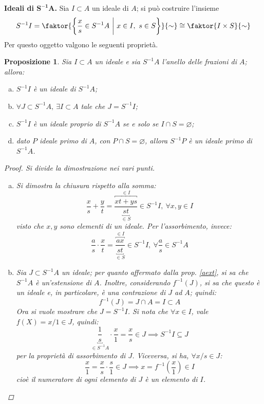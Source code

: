 \documentclass[12pt]{scrartcl}
\theoremstyle{style}
\newtheorem{prop}{Proposizione}[section]
\numberwithin{equation}{subsection}
\begin{document}
\textbf{Ideali di $\mathbf{S^{-1}A} $.} 
Sia $I \subset A$ un ideale di $A$; si pu\`o costruire l'insieme 
\begin{equation}
	S^{-1}I = \faktor{\left\{ \frac{x}{s} \in S^{-1}A \ \bigg\lvert\ x \in I, \ s \in S \right\} }{\sim} \cong \faktor{I \times S}{\sim}
\end{equation}
Per questo oggetto valgono le seguenti propriet\`a.
\begin{prop}
	Sia $I \subset A$ un ideale e sia $S^{-1}A$ l'anello delle frazioni di $A$; allora:
	\begin{enumerate}[(a).]
		\item $S^{-1}I$ \`e un ideale di $S^{-1}A$;
		\item $\forall J \subset S^{-1}A, \ \exists I\subset A$ tale che $J = S^{-1}I$;
		\item $S^{-1}I$ \`e un ideale proprio di $S^{-1}A$ se e solo se $I \cap S = \varnothing$;
		\item dato $P$ ideale primo di $A$, con $P\cap S = \varnothing$, allora $S^{-1}P$ \`e un ideale primo di $S^{-1}A$.
	\end{enumerate}
	\begin{proof}
		Si divide la dimostrazione nei vari punti.
		\begin{enumerate}[(a).]
			\item Si dimostra la chiusura rispetto alla somma:
				\[
					\frac{x}{s} + \frac{y}{t} = \frac{\overbracket{xt + ys}^{\in I} }{\underbracket{st}_{\in S} }\in S^{-1}I, \ \forall x,y \in I
				\] 
				visto che $x,y$ sono elementi di un ideale.
				Per l'assorbimento, invece:
\[
	\frac{a}{s}\cdot \frac{x}{t} = \frac{\overbracket{ax}^{\in I} }{\underbracket{st}_{\in S} } \in S^{-1}I , \ \forall \frac{a}{s}\in S^{-1}A
\] 
\item Sia $J \subset S^{-1}A$ un ideale; per quanto affermato dalla prop. \ref{aext}, si sa che $S^{-1}A$ \`e un'estensione di $A$.
	Inoltre, considerando $f^{-1}(J)$, si sa che questo \`e un ideale e, in particolare, \`e una contrazione di $J$ ad $A$; quindi:
	\[
	f^{-1}(J) = J\cap A = I \subset A
	\] 
	Ora si vuole mostrare che $J = S^{-1}I$.
	Si nota che $\forall x \in I$, vale $f(X) = x / 1 \in J$, quindi:
	\[
		\underbracket{\frac{1}{s} }_{\in S^{-1}A} \cdot \frac{x}{1}= \frac{x}{s} \in J\implies S^{-1}I \subseteq J
	\] 
	per la propriet\`a di assorbimento di $J$.
	Viceversa, si ha, $\forall x / s \in J$:
	\[
	\frac{x}{1} = \frac{x}{s} \cdot \frac{s}{1} \in J\implies x = f^{-1}\left(\frac{x}{1}\right) \in I
	\] 
	cio\`e il numeratore di ogni elemento di $J$ \`e un elemento di $I$.

\end{enumerate}
\end{proof}
\end{prop}
\end{document}
